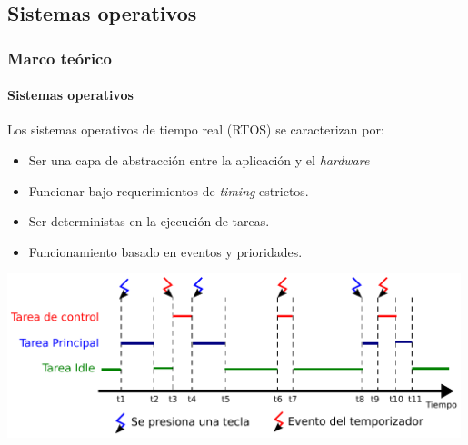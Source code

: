 \documentclass[xcolor=dvipsnames]{beamer}
\begin{document}
    \subsection{Sistemas operativos}
    \begin{frame}
        \frametitle{Marco teórico}
        \framesubtitle{Sistemas operativos}
        
            Los sistemas operativos de tiempo real (RTOS) se caracterizan por:
            \begin{itemize}
                    \item Ser una capa de abstracción entre la aplicación y el \textit{hardware}
                \item Funcionar bajo requerimientos de \textit{timing} estrictos.
                \item Ser deterministas en la ejecución de tareas.
                \item Funcionamiento basado en eventos y prioridades.
            \end{itemize}

        
        \vspace{0.5cm}
        \centering
        \includegraphics[width=0.99\textwidth]{img/rtos.pdf}
        
    \end{frame}
    
\end{document}
